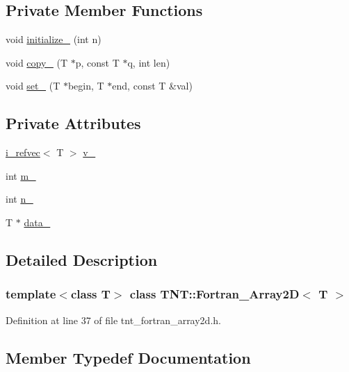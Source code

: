 \subsection*{Private Member Functions}
\begin{DoxyCompactItemize}
\item 
void \hyperlink{classTNT_1_1Fortran__Array2D_adcee9bb7a12225f561a2f8d9ac7aabc3}{initialize\+\_\+} (int n)
\item 
void \hyperlink{classTNT_1_1Fortran__Array2D_aa7aabeb85b00a5a0f268d036eb76b90f}{copy\+\_\+} (T $\ast$p, const T $\ast$q, int len)
\item 
void \hyperlink{classTNT_1_1Fortran__Array2D_a5b371e6ec0f42a898c675c7daf643a4e}{set\+\_\+} (T $\ast$begin, T $\ast$end, const T \&val)
\end{DoxyCompactItemize}
\subsection*{Private Attributes}
\begin{DoxyCompactItemize}
\item 
\hyperlink{classTNT_1_1i__refvec}{i\+\_\+refvec}$<$ T $>$ \hyperlink{classTNT_1_1Fortran__Array2D_abc689cf56a71ebea8c866abe193b0c9e}{v\+\_\+}
\item 
int \hyperlink{classTNT_1_1Fortran__Array2D_ab3f53a5ab63db57a130fb2f7e971d559}{m\+\_\+}
\item 
int \hyperlink{classTNT_1_1Fortran__Array2D_a8b656d89a906bc217416b2c98d6b85ee}{n\+\_\+}
\item 
T $\ast$ \hyperlink{classTNT_1_1Fortran__Array2D_a227b8df79bc227c837717f3f112ef72e}{data\+\_\+}
\end{DoxyCompactItemize}


\subsection{Detailed Description}
\subsubsection*{template$<$class T$>$\newline
class T\+N\+T\+::\+Fortran\+\_\+\+Array2\+D$<$ T $>$}



Definition at line 37 of file tnt\+\_\+fortran\+\_\+array2d.\+h.



\subsection{Member Typedef Documentation}
\mbox{\label{classTNT_1_1Fortran__Array2D_a498268efd59880dbd352e67e283ea042}} 
